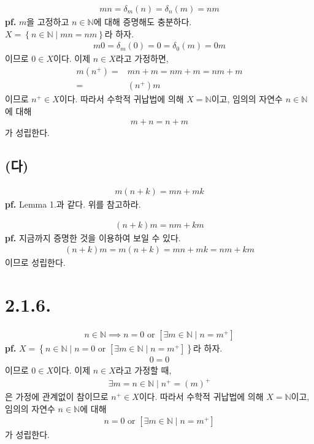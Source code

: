 \documentclass{article}
\begin{document}
\begin{align*}
mn = \delta_m(n) = \delta_n(m) = nm
\end{align*}
\textbf{pf.} $m$을 고정하고 $n \in \mathbb{N}$에 대해 증명해도 충분하다. 
\\$X = \left\{n \in \mathbb{N} \mid mn=nm \right\}$라 하자.
\begin{align*}
m0 = \delta_m(0) = 0 = \delta_0(m) = 0m
\end{align*}이므로 $0 \in X$이다. 이제 $n \in X$라고 가정하면,
\begin{align*}
m(n^+) =& mn + m = nm + m = nm + m 
\\=& (n^+)m \tag{$\because$ Lemma 2.}
\end{align*}이므로 $n^+ \in X$이다. 따라서 수학적 귀납법에 의해 $X = \mathbb{N}$이고, 임의의 자연수 $n \in \mathbb{N}$에 대해
\begin{align*}
m+n = n+m
\end{align*}가 성립한다. 


\subsection{(다)}
\begin{align*}
m(n+k) = mn + mk
\end{align*}
\textbf{pf.} Lemma 1.과 같다. 위를 참고하라.

\begin{align*}
(n+k)m = nm + km
\end{align*}
\textbf{pf.} 지금까지 증명한 것을 이용하여 보일 수 있다.
\begin{align*}
(n+k)m = m(n+k) = mn + mk = nm + km
\end{align*}이므로 성립한다.

\section{2.1.6.}
\begin{align*}
n \in \mathbb{N} \implies n = 0 \text{ or } [\exists m \in \mathbb{N} \mid n = m^+]
\end{align*}
\textbf{pf.} $X = \left\{ n \in \mathbb{N} \mid n = 0 \text{ or } [\exists m \in \mathbb{N} \mid n = m^+] \right\}$라 하자.
\begin{align*}
0 = 0
\end{align*}이므로 $0 \in X$이다. 이제 $n \in X$라고 가정할 때,
\begin{align*}
\exists m = n \in \mathbb{N} \mid n^+ = (m)^+
\end{align*}은 가정에 관계없이 참이므로 $n^+ \in X$이다. 따라서 수학적 귀납법에 의해 $X = \mathbb{N}$이고, 임의의 자연수 $n \in \mathbb{N}$에 대해
\begin{align*}
n = 0 \text{ or } [\exists m \in \mathbb{N} \mid n = m^+] 
\end{align*}가 성립한다.
\end{document}
